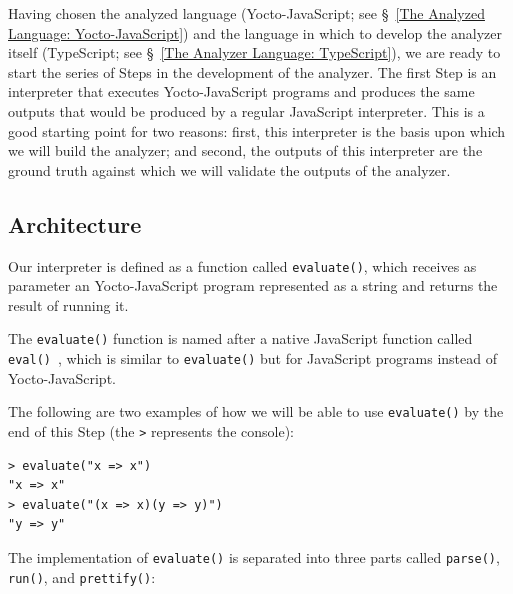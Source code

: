 \documentclass[12pt, oneside]{book}
\begin{document}
Having chosen the analyzed language (Yocto-JavaScript; see §~\ref{The Analyzed Language: Yocto-JavaScript}) and the language in which to develop the analyzer itself (TypeScript; see §~\ref{The Analyzer Language: TypeScript}), we are ready to start the series of Steps in the development of the analyzer. The first Step is an interpreter that executes Yocto-JavaScript programs and produces the same outputs that would be produced by a regular JavaScript interpreter. This is a good starting point for two reasons: first, this interpreter is the basis upon which we will build the analyzer; and second, the outputs of this interpreter are the ground truth against which we will validate the outputs of the analyzer.

\subsection{Architecture}
\label{Architecture}

Our interpreter is defined as a function called \texttt{evaluate()}, which receives as parameter an Yocto-JavaScript program represented as a string and returns the result of running it.

\begin{mdframed}[frametitle = {Advanced}]
The \texttt{evaluate()} function is named after a native JavaScript function called \texttt{eval()}~\cite{eval}, which is similar to \texttt{evaluate()} but for JavaScript programs instead of Yocto-JavaScript.
\end{mdframed}

The following are two examples of how we will be able to use \texttt{evaluate()} by the end of this Step (the \texttt{>} represents the console):

\begin{verbatim}
> evaluate("x => x")
"x => x"
> evaluate("(x => x)(y => y)")
"y => y"
\end{verbatim}

The implementation of \texttt{evaluate()} is separated into three parts called \texttt{parse()}, \texttt{run()}, and \texttt{prettify()}:
\end{document}
